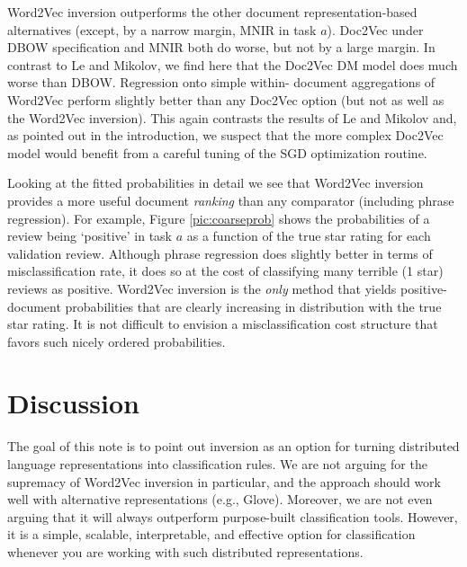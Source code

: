 \documentclass[11pt]{article}
\begin{document}
Word2Vec inversion outperforms the other document representation-based
alternatives (except, by a narrow margin, MNIR in task $a$).  Doc2Vec under
DBOW specification and MNIR both do worse, but not by a large margin. In
contrast to  Le and Mikolov, we find here that the Doc2Vec DM model does much
worse than DBOW.  Regression onto simple within- document aggregations of
Word2Vec perform slightly better than any Doc2Vec option (but not as well as
the Word2Vec inversion).  This again contrasts the results of Le and Mikolov
and, as pointed out in the introduction, we suspect that the more complex
Doc2Vec model would benefit from a careful tuning of the SGD optimization
routine.

Looking at the fitted probabilities in detail we see that Word2Vec inversion
provides a more useful document {\it ranking} than any comparator (including
phrase regression).  For example, Figure \ref{pic:coarseprob} shows the
probabilities of a review being `positive' in task $a$ as a function of the
true star rating for each validation review. Although phrase regression does
slightly better in terms of misclassification rate, it does so at the cost of
classifying many terrible (1 star) reviews as positive.  Word2Vec inversion is
the {\it only} method that yields positive-document probabilities that are
clearly increasing in distribution with the true star rating.  It is not
difficult to envision a misclassification cost structure that favors such
nicely ordered probabilities.

\section{Discussion}

The goal of this note is to point out inversion as an option for turning distributed language representations into classification rules.  We are not arguing for the supremacy of Word2Vec inversion in particular, and the approach should work well with alternative representations (e.g., Glove).  Moreover, we are not even arguing that it will always outperform purpose-built classification tools.  However, it is a simple, scalable, interpretable, and effective option for classification whenever you are working with such distributed representations.



\end{document}
